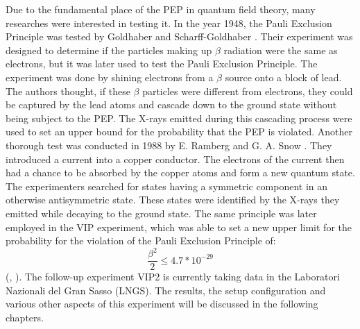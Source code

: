 Due to the fundamental place of the PEP in quantum field theory, many researches were interested in testing it. In the year 1948, the Pauli Exclusion Principle was tested by Goldhaber and Scharff-Goldhaber \cite{Goldhaber1948}. Their experiment was designed to determine if the particles making up $\beta$ radiation were the same as electrons, but it was later used to test the Pauli Exclusion Principle. The experiment was done by shining electrons from a $\beta$ source onto a block of lead. The authors thought, if these $\beta$ particles were different from electrons, they could be captured by the lead atoms and cascade down to the ground state without being subject to the PEP. The X-rays emitted during this cascading process were used to set an upper bound for the probability that the PEP is violated. Another thorough test was conducted in 1988 by E. Ramberg and G. A. Snow \cite{RAMBERG1990}. They introduced a current into a copper conductor. The electrons of the current then had a chance to be absorbed by the copper atoms and form a new quantum state. The experimenters searched for states having a symmetric component in an otherwise antisymmetric state. These states were identified by the X-rays they emitted while decaying to the ground state. The same principle was later employed in the VIP experiment, which was able to set a new upper limit for the probability for the violation of the Pauli Exclusion Principle of:%
%
\begin{equation*}
\frac{\beta^{2}}{2} \leq 4.7 * 10^{-29}                                                                                                                                                                                                                                                                                                                                                                                                                                                                                                                                                                                                                                                                                                                                                                                                                                                                                                                                                                                                                                                                                                                                                                                                                                                                                                                                                                                                                                                                                                      \end{equation*}
%
(\cite{Curceanu2012}, \cite{Curceanu2011}). The follow-up experiment VIP2 is currently taking data in the Laboratori Nazionali del Gran Sasso (LNGS). The results, the setup configuration and various other aspects of this experiment will be discussed in the following chapters.